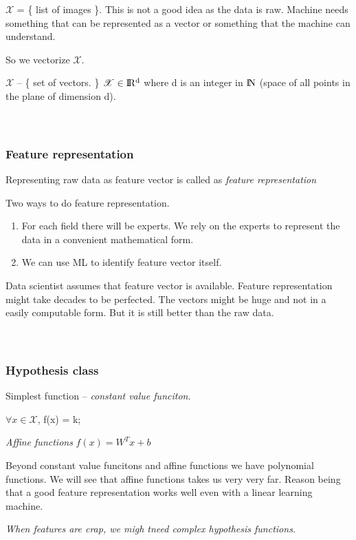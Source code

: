 \documentclass{article}
\begin{document}
\(\mathcal{X}\) = \{ list of images \}.  This is not a good idea as the data is raw.  Machine needs something that can be represented as a vector or something that the machine can understand.

So we vectorize \( \mathcal{X} \).

\( \mathcal{X} \) -- \{ set of vectors. \}
\( \mathcal{X} \in \rm I\!R ^{d}\)  where d is an integer in \(\rm I\!N\) (space of all points in the plane of dimension d).\\\\\\
\subsubsection*{Feature representation}
Representing raw data as feature vector is called as \textit{feature representation}

Two ways to do feature representation.
\begin{enumerate}
	\item For each field there will be experts.  We rely on the experts to represent the data in a convenient mathematical form.
	\item We can use ML to identify feature vector itself.
\end{enumerate}

Data scientist assumes that feature vector is available.  Feature representation might take decades to be perfected.  The vectors might be huge and not in a easily computable form.  But it is still better than the raw data.\\\\\\
\subsubsection*{Hypothesis class}

Simplest function -- \textit{constant value funciton}.

\(\forall x \in \mathcal{X}\), f(x) = k;

\textit{Affine functions}
\(f(x) = W^{T}x + b\)

Beyond constant value funcitons and affine functions we have polynomial functions.  We will see that affine functions takes us very very far.  Reason being that a good feature representation works well even with a linear learning machine.

\textit{When features are crap, we migh tneed complex hypothesis functions.}\\\\\\
\end{document}
